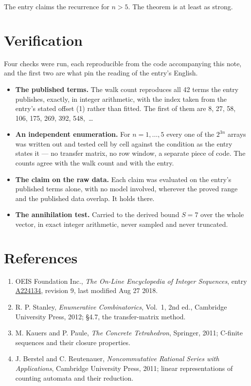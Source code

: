 \documentclass[11pt]{article}
\theoremstyle{definition}
\begin{document}
The entry claims the recurrence for $n > 5$. The theorem is at least as strong.

\section{Verification}

Four checks were run, each reproducible from the code accompanying this note, and the first two are what pin the reading of the entry's English.

\begin{itemize}

\item {\bfseries The published terms.} The walk count reproduces all 42 terms the entry publishes, exactly, in integer arithmetic, with the index taken from the entry's stated offset (1) rather than fitted. The first of them are 8, 27, 58, 106, 175, 269, 392, 548,~\dots

\item {\bfseries An independent enumeration.} For $n = 1,\dots,5$ every one of the $2^{3n}$ arrays was written out and tested cell by cell against the condition as the entry states it --- no transfer matrix, no row window, a separate piece of code. The counts agree with the walk count and with the entry.

\item {\bfseries The claim on the raw data.} Each claim was evaluated on the entry's published terms alone, with no model involved, wherever the proved range and the published data overlap. It holds there.

\item {\bfseries The annihilation test.} Carried to the derived bound $S = 7$ over the whole vector, in exact integer arithmetic, never sampled and never truncated.

\end{itemize}

\section{References}

\begin{enumerate}

\item OEIS Foundation Inc., \emph{The On-Line Encyclopedia of Integer Sequences}, entry \href{https://oeis.org/A224134}{A224134}, revision 9, last modified Aug 27 2018.

\item R. P. Stanley, \emph{Enumerative Combinatorics}, Vol.~1, 2nd ed., Cambridge University Press, 2012; \S4.7, the transfer-matrix method.

\item M. Kauers and P. Paule, \emph{The Concrete Tetrahedron}, Springer, 2011; C-finite sequences and their closure properties.

\item J. Berstel and C. Reutenauer, \emph{Noncommutative Rational Series with Applications}, Cambridge University Press, 2011; linear representations of counting automata and their reduction.

\end{enumerate}
\end{document}
